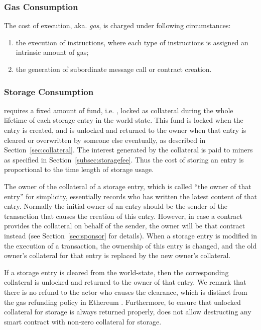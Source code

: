 \subsubsection{Gas Consumption}

The cost of execution, aka. \emph{gas}, is charged under following circumstances:
\begin{enumerate}[nosep]
	\item the execution of instructions, where each type of instructions is assigned an intrinsic amount of gas;

	\item the generation of subordinate message call or contract creation.

\end{enumerate}


\subsubsection{Storage Consumption}
	\label{subsec:storage consumption}

	\name requires a fixed amount of fund, i.e. \sunitprice, locked as collateral during the whole lifetime of each \sunitsize storage entry in the world-state.
	This fund is locked when the entry is created, and is unlocked and returned to the owner when that entry is cleared or overwritten by someone else eventually, as described in Section~\ref{sec:collateral}.
	The interest generated by the collateral is paid to miners as specified in Section~\ref{subsec:storagefee}. 
	Thus the cost of storing an entry  
	is proportional to the time length of storage usage.

	
	The owner of the collateral of a storage entry, 
	which is called ``the owner of that entry'' for simplicity, 
	essentially records who has written the latest content of that entry.
	Normally the initial owner of an entry should be the sender of the transaction that causes the creation of this entry. 
	However, in case a contract provides the collateral on behalf of the sender, the owner will be that contract instead (see Section~\ref{sec:sponsor} for details).
	When a storage entry is modified in the execution of a transaction,
	the ownership of this entry is changed,
	and the old owner's collateral for that entry is replaced by the new owner's collateral.


	If a storage entry is cleared from the world-state,
	then the corresponding collateral is unlocked and returned to the owner of that entry.
	We remark that there is no refund to the actor who causes the clearance, 
	which is distinct from the gas refunding policy in Ethereum \cite{ETH_yellow}.
	Furthermore, to ensure that unlocked collateral for storage is always returned properly, 
	\name does not allow destructing any smart contract with non-zero collateral for storage.


